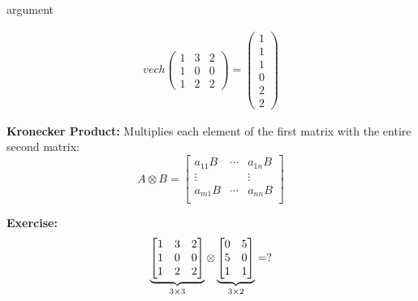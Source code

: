 \begin{labeling}{argument}
    \begin{sol}
        \begin{align*}
            vech \begin{pmatrix}
                     1 & 3 & 2 \\
                     1 & 0 & 0 \\
                     1 & 2 & 2
                 \end{pmatrix}
            =
            \begin{pmatrix}
                1 \\ 1 \\ 1 \\ 0 \\ 2 \\ 2
            \end{pmatrix}
        \end{align*}
    \end{sol}

    \item[\textbf{Kronecker Product:}] Multiplies each element of the first matrix with the entire second matrix:
    \[
        A \otimes B = \begin{bmatrix}
            a_{11} B & \cdots & a_{1n} B \\
            \vdots   &        & \vdots   \\
            a_{m1} B & \cdots & a_{nn} B \\
        \end{bmatrix}
    \]

    \textbf{Exercise:}
    \[
        \underbrace{%
            \begin{bmatrix}
                1 & 3 & 2 \\
                1 & 0 & 0 \\
                1 & 2 & 2
            \end{bmatrix}%
        }_{3 \times 3}
        \otimes
        \underbrace{%
            \begin{bmatrix}
                0 & 5 \\
                5 & 0 \\
                1 & 1
            \end{bmatrix}%
        }_{3 \times 2}
        = ?
    \]


\end{labeling}
